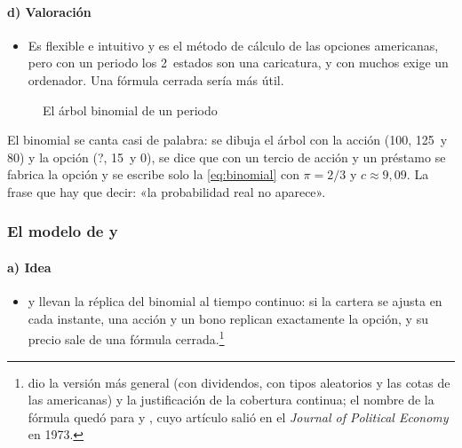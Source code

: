 \documentclass[11pt]{article}
\begin{document}
\paragraph{d) Valoración}

\begin{itemize}
\item Es flexible e intuitivo y es el método de cálculo de las opciones americanas, pero con un periodo los 2~estados son una caricatura, y con muchos exige un ordenador. Una fórmula cerrada sería más útil.
\end{itemize}

\begin{figure}[H]
\centering
\caption{El árbol binomial de un periodo}\label{fig:arbol-binomial}
\end{figure}

\begin{notaopositor}
El binomial se canta casi de palabra: se dibuja el árbol con la acción (100, 125~y 80) y la opción (?, 15~y 0), se dice que con un tercio de acción y un préstamo se fabrica la opción y se escribe solo la \eqref{eq:binomial} con $\pi=2/3$ y $c\approx9{,}09$. La frase que hay que decir: «la probabilidad real no aparece».
\end{notaopositor}

\subsubsection{El modelo de  y }\label{sec:black-scholes}

\paragraph{a) Idea}

\begin{itemize}
\item \textcite{BlackScholes1973Pricing} y \textcite{Merton1973Theory} llevan la réplica del binomial al tiempo continuo: si la cartera se ajusta en cada instante, una acción y un bono replican exactamente la opción, y su precio sale de una fórmula cerrada.\footnote{\textcite{Merton1973Theory} dio la versión más general (con dividendos, con tipos aleatorios y las cotas de las americanas) y la justificación de la cobertura continua; el nombre de la fórmula quedó para  y , cuyo artículo salió en el \emph{Journal of Political Economy} en 1973.}
\end{itemize}
\end{document}
